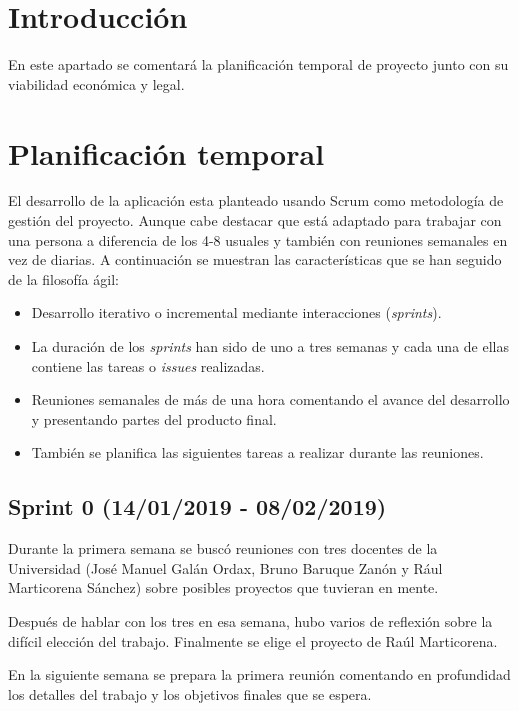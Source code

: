 
\section{Introducción}

En este apartado se comentará la planificación temporal de proyecto junto con su viabilidad económica y legal.

\section{Planificación temporal}

El desarrollo de la aplicación esta planteado usando Scrum como metodología de gestión del proyecto. Aunque cabe destacar que está adaptado para trabajar con una persona a diferencia de los 4-8 usuales y también con reuniones semanales en vez de diarias. A continuación se muestran las características que se han seguido de la filosofía ágil:


\begin{itemize}
	\item Desarrollo iterativo o incremental mediante interacciones (\textit{sprints}).
	\item La duración de los \textit{sprints} han sido de uno a tres semanas y cada una de ellas contiene las tareas o \textit{issues} realizadas.
	\item Reuniones semanales de más de una hora comentando el avance del desarrollo y presentando partes del producto final.
	\item También se planifica las siguientes tareas a realizar durante las reuniones.
	
\end{itemize}

\subsection{Sprint 0 (14/01/2019 - 08/02/2019)}

Durante la primera semana se buscó reuniones con tres docentes de la Universidad (José Manuel Galán Ordax, Bruno Baruque Zanón y Rául Marticorena Sánchez) sobre posibles proyectos que tuvieran en mente.

Después de hablar con los tres en esa semana, hubo varios de reflexión sobre la difícil elección del trabajo. Finalmente se elige el proyecto de Raúl Marticorena.

En la siguiente semana se prepara la primera reunión comentando en profundidad los detalles del trabajo y los objetivos finales que se espera.

